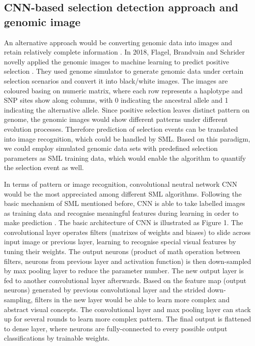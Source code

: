 \documentclass[a4paper,12pt,oneside]{extarticle}
\begin{document}
\subsection{CNN-based selection detection approach and genomic image}
An alternative approach would be converting genomic data into images and retain relatively complete information \cite{23}. In 2018, Flagel, Brandvain and Schrider novelly applied the genomic images to machine learning to predict positive selection \cite{17}. They used genome simulator to generate genomic data under certain selection scenarios and convert it into black/white images. The images are coloured basing on numeric matrix, where each row represents a haplotype and SNP sites show along columns, with 0 indicating the ancestral allele and 1 indicating the alternative allele. Since positive selection leaves distinct pattern on genome, the genomic images would show different patterns under different evolution processes. Therefore prediction of selection events can be translated into image recognition, which could be handled by SML. Based on this paradigm, we could employ simulated genomic data sets with predefined selection parameters as SML training data, which would enable the algorithm to quantify the selection event as well.
\par
In terms of pattern or image recognition, convolutional neutral network CNN would be the most appreciated among different SML algorithms. Following the basic mechanism of SML mentioned before, CNN is able to take labelled images as training data and recognise meaningful features during learning in order to make prediction \cite{24}. The basic architecture of CNN is illustrated as Figure 1. The convolutional layer operates filters (matrixes of weights and biases) to slide across input image or previous layer, learning to recognise special visual features by tuning their weights. The output neurons (product of math operation between filters, neurons from previous layer and activation function) is then down-sampled by max pooling layer to reduce the parameter number. The new output layer is fed to another convolutional layer afterwards. Based on the feature map (output neurons) generated by previous convolutional layer and the strided down-sampling, filters in the new layer would be able to learn more complex and abstract visual concepts. The convolutional layer and max pooling layer can stack up for several rounds to learn more complex pattern. The final output is flattened to dense layer, where neurons are fully-connected to every possible output classifications by trainable weights.
\end{document}
